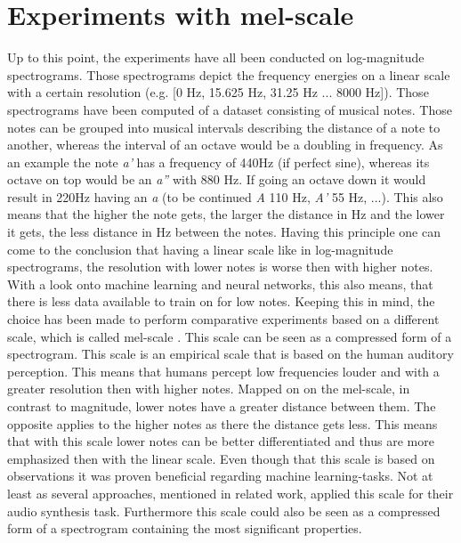 \section{Experiments with mel-scale}
\label{sec:exp_mel}
Up to this point, the experiments have all been conducted on log-magnitude spectrograms. Those spectrograms depict the frequency energies on a linear scale with a certain resolution (e.g. [0 Hz, 15.625 Hz, 31.25 Hz ... 8000 Hz]). Those spectrograms have been computed of a dataset consisting of musical notes. Those notes can be grouped into musical intervals describing the distance of a note to another, whereas the interval of an octave would be a doubling in frequency. As an example the note \textit{a'} has a frequency of 440Hz (if perfect sine), whereas its octave on top would be an \textit{a''} with 880 Hz. If going an octave down it would result in 220Hz having an \textit{a} (to be continued \textit{A} 110 Hz, \textit{A'} 55 Hz, ...). This also means that the higher the note gets, the larger the distance in Hz and the lower it gets, the less distance in Hz between the notes. Having this principle one can come to the conclusion that having a linear scale like in log-magnitude spectrograms, the resolution with lower notes is worse then with higher notes. With a look onto machine learning and neural networks, this also means, that there is less data available to train on for low notes.
Keeping this in mind, the choice has been made to perform comparative experiments based on a different scale, which is called mel-scale \cite{stevens1937scale}. This scale can be seen as a compressed form of a spectrogram. This scale is an empirical scale that is based on the human auditory perception. This means that humans percept low frequencies louder and with a greater resolution then with higher notes. Mapped on on the mel-scale, in contrast to magnitude, lower notes have a greater distance between them. The opposite applies to the higher notes as there the distance gets less. This means that with this scale lower notes can be better differentiated and thus are more emphasized then with the linear scale. Even though that this scale is based on observations it was proven beneficial regarding machine learning-tasks. Not at least as several approaches, mentioned in related work, applied this scale for their audio synthesis task. Furthermore this scale could also be seen as a compressed form of a spectrogram containing the most significant properties. 

